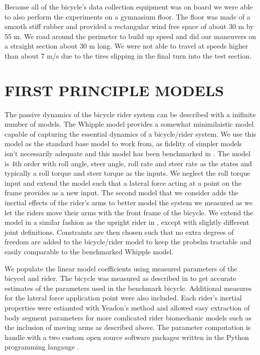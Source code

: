 \documentclass[twocolumn,10pt]{asme2e}
\begin{document}
Because all of the bicycle's data collection equipment was on board we were
able to also perform the experiments on a gymnasium floor. The floor was made
of a smooth stiff rubber and provided a rectangular wind free space of about 30
m by 55 m. We road around the perimeter to build up speed and did our maneuvers
on a straight section about 30 m long. We were not able to travel at speeds
higher than about 7 m/s due to the tires slipping in the final turn into the
test section.

\section*{FIRST PRINCIPLE MODELS}
The passive dynamics of the bicycle rider system can be described with a
inifinite number of models. The Whipple model \cite{Whipple1899} provides a
somewhat minimilaistic model capable of capturing the essential dynamics of a
bicycle/rider system. We use this model as the standard base model to work
from, as fidelity of simpler models isn't necessarily adequate and this model
has been benchmarked in \cite{Meijaard2007,Basu-Mandal2007}. The model is 4th
order with roll angle, steer angle, roll rate and steer rate as the states and
typically a roll torque and steer torque as the inputs. We neglect the roll
torque input and extend the model such that a lateral force acting at a point
on the frame provides as a new input. The second model that we consider adds
the inertial effects of the rider's arms to better model the system we measured
as we let the riders move their arms with the front frame of the bicycle. We
extend the model in a similar fashion as the upright rider in
\cite{Schwab2012}, except with slightly different joint definitions.
Constraints are then chosen such that no extra degrees of freedom are added to
the bicycle/rider model to keep the probelm tractable and easily comparable to
the benchmarked Whipple model.

We populate the linear model coefficients using measured parameters of the
bicycel and rider. The bicycle was measured as described in \cite{Moore2010} to
get accurate estimates of the parameters used in the benchmark bicycle.
Additional measures for the lateral force application point were also included.
Each rider's inertial properties were estiamted with Yeadon's method
\cite{Yeadon1990a} and allowed easy extraction of body segment parameters for
more comlicated rider biomechanic models such as the inclusion of moving arms
as described above. The parameter computation is handle with a two custom open
source software packages written in the Python programming langauge
\cite{Moore2011a,Dembia2011}.
\end{document}
